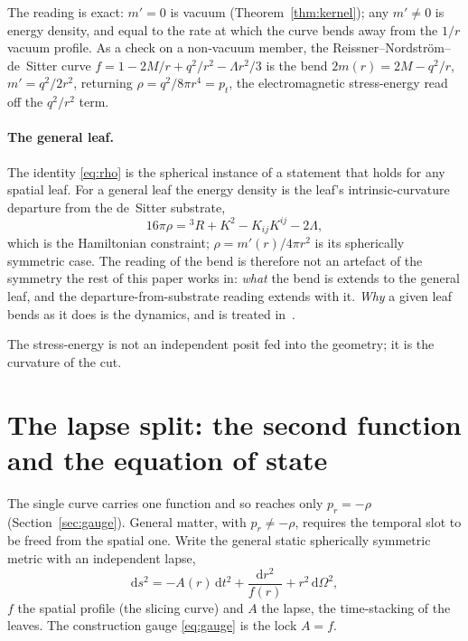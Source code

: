 \documentclass[11pt,a4paper]{article}
\theoremstyle{definition}
\newcommand{\dd}{\mathrm{d}}
\begin{document}
The reading is exact: $m'=0$ is vacuum (Theorem~\ref{thm:kernel}); any $m'\neq0$ is energy density, and equal to the rate at which the curve bends away from the $1/r$ vacuum profile. As a check on a non-vacuum member, the Reissner--Nordstr\"om--de~Sitter curve $f=1-2M/r+q^{2}/r^{2}-\Lambda r^{2}/3$ is the bend $2m(r)=2M-q^{2}/r$, $m'=q^{2}/2r^{2}$, returning $\rho=q^{2}/8\pi r^{4}=p_{t}$, the electromagnetic stress-energy read off the $q^{2}/r^{2}$ term. \paragraph{The general leaf.} The identity \eqref{eq:rho} is the spherical instance of a statement
that holds for any spatial leaf. For a general leaf the energy density is the leaf's
intrinsic-curvature departure from the de~Sitter substrate,
\begin{equation}\label{eq:bend-general}
16\pi\rho = {}^{3}R + K^{2} - K_{ij}K^{ij} - 2\Lambda,
\end{equation}
which is the Hamiltonian constraint; $\rho=m'(r)/4\pi r^{2}$ is its spherically symmetric case. The
reading of the bend is therefore not an artefact of the symmetry the rest of this paper works in:
\emph{what} the bend is extends to the general leaf, and the departure-from-substrate reading extends
with it. \emph{Why} a given leaf bends as it does is the dynamics, and is treated
in~\cite{JanzenDynamics, JanzenCanonicalTime}.

The stress-energy is not an independent posit fed into the geometry; it is the curvature of the cut.

\section{The lapse split: the second function and the equation of state}\label{sec:lapse}

The single curve carries one function and so reaches only $p_{r}=-\rho$ (Section~\ref{sec:gauge}). General matter, with $p_{r}\neq-\rho$, requires the temporal slot to be freed from the spatial one. Write the general static spherically symmetric metric with an independent lapse,
\begin{equation}\label{eq:twofn}
\dd s^{2}=-A(r)\,\dd t^{2}+\frac{\dd r^{2}}{f(r)}+r^{2}\,\dd\Omega^{2},
\end{equation}
$f$ the spatial profile (the slicing curve) and $A$ the lapse, the time-stacking of the leaves. The construction gauge \eqref{eq:gauge} is the lock $A=f$.
\end{document}
